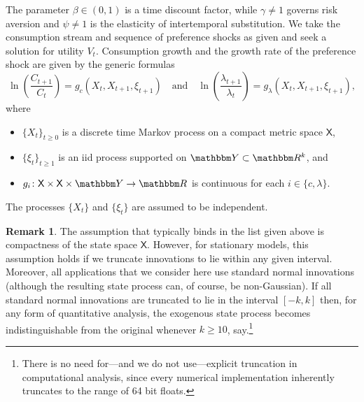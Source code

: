 \documentclass[12pt, reqno]{amsart}
\renewcommand{\geq}{\geqslant}
\newcommand{\1}{\mathbbm 1}
\newcommand{\RR}{\mathbbm R}
\newcommand{\YY}{\mathbbm Y}
\newcommand{\XX}{\mathsf X}
\theoremstyle{plain}
\theoremstyle{definition}
\newtheorem{remark}{Remark}[section]
\begin{document}
The parameter $\beta \in (0, 1)$ is a time discount factor, while $\gamma
\not=1$ governs risk aversion and $\psi \not=1$ is the elasticity of
intertemporal substitution.  We take the consumption stream and sequence of
preference shocks as given and seek a solution for utility $V_t$. Consumption
growth and the growth rate of the preference shock are given by the generic
formulas
%
\begin{equation}
    \label{eq:kappa}
    \ln \left( \frac{C_{t+1}}{C_t} \right)
    = g_c(X_t, X_{t+1}, \xi_{t+1})
    \quad \text{and} \quad
    \ln \left( \frac{\lambda_{t+1}}{\lambda_t} \right) 
    = g_\lambda(X_t, X_{t+1}, \xi_{t+1}),
\end{equation}
%
where 
%
\begin{itemize}
    \item $\{ X_t \}_{t \geq 0}$ is a discrete time Markov process on a compact
        metric space $\XX$,
    \item $\{ \xi_t \}_{t \geq 1}$ is an {\sc iid} process supported on $\YY \subset \RR^k$, and
    \item $g_i \colon \XX \times \XX \times \YY \to \RR$ is continuous for
        each $i \in \{c, \lambda\}$.
\end{itemize}
%
The processes $\{X_t\}$  and $\{\xi_t\}$ are assumed to be independent.

\begin{remark}
    The assumption that typically binds in the list given above is compactness of
    the state space $\XX$.  However, for stationary models, this assumption holds if we truncate
    innovations to lie within any given interval. Moreover, all
    applications that we consider here use standard normal innovations (although the
    resulting state process can, of course, be non-Gaussian).  If all standard
    normal innovations are truncated to lie in the interval $[-k, k]$ then,
    for any form of quantitative analysis, the exogenous state process
    becomes indistinguishable from the original whenever $k \geq 10$,
    say.\footnote{There is no need for---and we do not use---explicit
        truncation in computational analysis, since every numerical
        implementation inherently truncates to the range of 64 bit
        floats.}
\end{remark}
\end{document}
